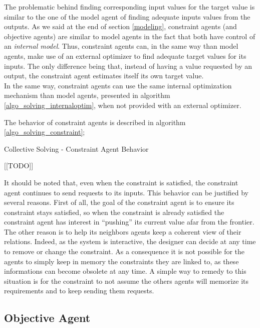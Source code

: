 The problematic behind finding corresponding input values for the target value is similar to the one of the model agent of finding adequate inputs values from the outputs. As we said at the end of section \ref{modeling}, constraint agents (and objective agents) are similar to model agents in the fact that both have control of an \emph{internal model}. Thus, constraint agents can, in the same way than model agents, make use of an external optimizer to find adequate target values for its inputs. The only difference being that, instead of having a value requested by an output, the constraint agent estimates itself its own target value.\\
In the same way, constraint agents can use the same internal optimization mechanism than model agents, presented in algorithm \ref{algo_solving_internaloptim},  when not provided with an external optimizer.

The behavior of constraint agents is described in algorithm \ref{algo_solving_constraint};

\begin{algorithm}
\caption{Collective Solving - Constraint Agent Behavior}
\label{algo_solving_constraint}

	[[TODO]]\;
	
\end{algorithm}

It should be noted that, even when the constraint is satisfied, the constraint agent continues to send requests to its inputs. This behavior can be justified by several reasons.  First of all, the goal of the constraint agent is to ensure its constraint stays satisfied, so when the constraint is already  satisfied the constraint agent has interest in \enquote{pushing} its current value afar from the frontier.\\
The other reason is to help its neighbors agents keep a coherent view of their relations. Indeed, as the system is interactive, the designer can decide at any time to remove or change the constraint. As a consequence it is not possible for the agents to simply keep in memory the constraints they are linked to, as these informations can become obsolete at any time. A simple way to remedy to this situation is for the constraint to not assume the others agents will memorize its requirements and to keep sending them requests.

\subsection{Objective Agent}


